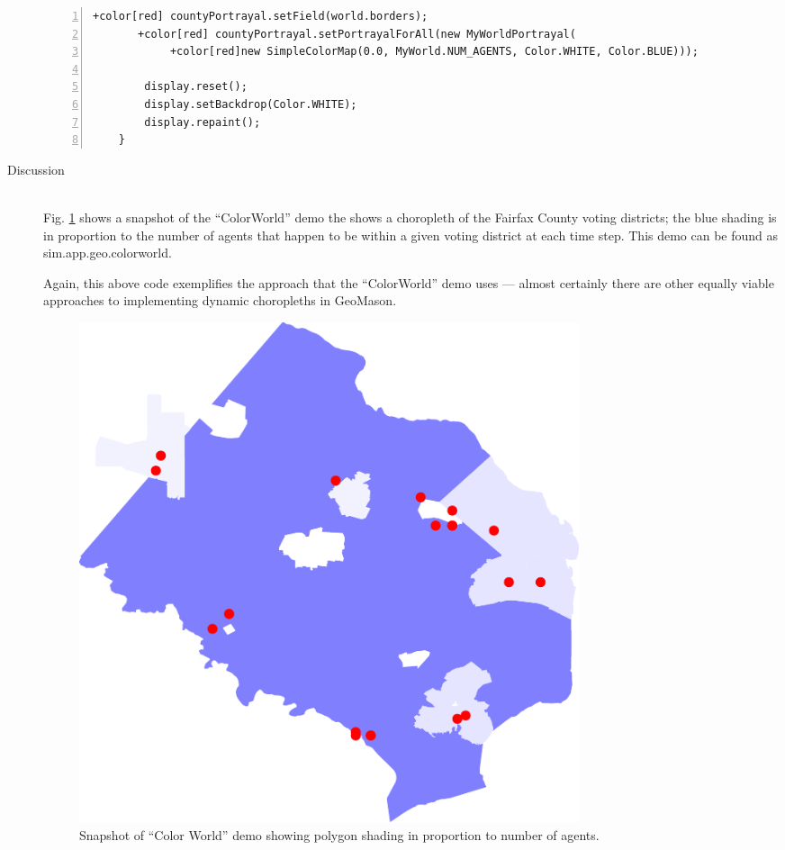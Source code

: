 \documentclass[twoside,10pt]{book}
\newcommand\file[1]{\textsf{#1}}
\newcommand\class[1]{\index{Classes!{#1}}\textsf{#1}}
\begin{document}
\begin{description}
\begin{Verbatim}[frame=lines,label=Set up portrayal in \class{GUIState},framesep=5mm,numbers=left,commandchars=+\[\]]
       +color[red] countyPortrayal.setField(world.borders);
       +color[red] countyPortrayal.setPortrayalForAll(new MyWorldPortrayal(
            +color[red]new SimpleColorMap(0.0, MyWorld.NUM_AGENTS, Color.WHITE, Color.BLUE)));

        display.reset();
        display.setBackdrop(Color.WHITE);
        display.repaint();
    }
\end{Verbatim}


\item[Discussion]~\\
Fig. \ref{fig:colorworld} shows a snapshot of the ``ColorWorld'' demo
the shows a choropleth of the Fairfax County voting districts; the
blue shading is in proportion to the number of agents that happen to
be within a given voting district at each time step.  This demo can be
found as \file{sim.app.geo.colorworld}.

Again, this above code exemplifies the approach that the ``ColorWorld'' demo uses ---
almost certainly there are other equally viable approaches to
implementing dynamic choropleths in GeoMason.

\begin{figure}[ht]
  \centering
  \includegraphics[width=0.75\textwidth]{ColorWorld.pdf}
  \caption{Snapshot of ``Color World'' demo showing polygon shading in
    proportion to number of agents.}
  \label{fig:colorworld}
\end{figure}

\end{description}


\end{document}
